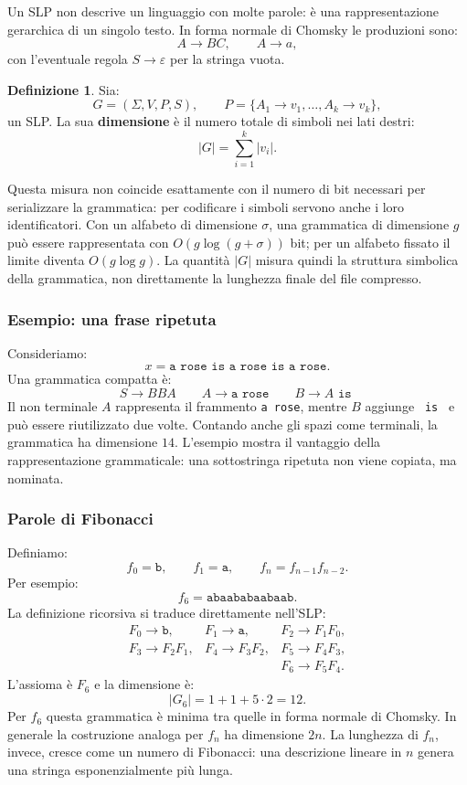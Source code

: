 \documentclass{article}
\theoremstyle{definition}
\newtheorem{definizione}{Definizione}[section]
\numberwithin{equation}{section}
\begin{document}
Un SLP non descrive un linguaggio con molte parole: è una rappresentazione
gerarchica di un singolo testo. In forma normale di Chomsky le produzioni sono:
\[
    A\to BC,
    \qquad
    A\to a,
\]
con l'eventuale regola $S\to\varepsilon$ per la stringa vuota.

\begin{definizione}
    Sia:
    \[
        G=(\Sigma,V,P,S),
        \qquad
        P=\{A_1\to v_1,\ldots,A_k\to v_k\},
    \]
    un SLP. La sua \textbf{dimensione} è il numero totale di simboli nei lati
    destri:
    \begin{equation}\label{eq:grammar_size}
        |G|=\sum_{i=1}^{k}|v_i|.
    \end{equation}
\end{definizione}

Questa misura non coincide esattamente con il numero di bit necessari per
serializzare la grammatica: per codificare i simboli servono anche i loro
identificatori. Con un alfabeto di dimensione $\sigma$, una grammatica di
dimensione $g$ può essere rappresentata con
$O(g\log(g+\sigma))$ bit; per un alfabeto fissato il limite diventa
$O(g\log g)$. La quantità $|G|$ misura quindi la struttura simbolica della
grammatica, non direttamente la lunghezza finale del file compresso.

\subsubsection{Esempio: una frase ripetuta}
Consideriamo:
\[
    x=\texttt{a rose is a rose is a rose}.
\]
Una grammatica compatta è:
\[
    S\to BBA
    \qquad
    A\to\texttt{a rose}
    \qquad
    B\to A\texttt{\ is\ }
\]
Il non terminale $A$ rappresenta il frammento \texttt{a rose}, mentre $B$
aggiunge \texttt{ is } e può essere riutilizzato due volte. Contando anche gli
spazi come terminali, la grammatica ha dimensione $14$. L'esempio mostra il
vantaggio della rappresentazione grammaticale: una sottostringa ripetuta non
viene copiata, ma nominata.

\subsubsection{Parole di Fibonacci}
Definiamo:
\[
    f_0=\texttt{b},
    \qquad
    f_1=\texttt{a},
    \qquad
    f_n=f_{n-1}f_{n-2}.
\]
Per esempio:
\[
    f_6=\texttt{abaababaabaab}.
\]
La definizione ricorsiva si traduce direttamente nell'SLP:
\[
    \begin{array}{lll}
        F_0\to\texttt{b}, &
        F_1\to\texttt{a}, &
        F_2\to F_1F_0,                         \\
        F_3\to F_2F_1,    &
        F_4\to F_3F_2,    &
        F_5\to F_4F_3,                         \\
                          &   & F_6\to F_5F_4.
    \end{array}
\]
L'assioma è $F_6$ e la dimensione è:
\[
    |G_6|=1+1+5\cdot 2=12.
\]
Per $f_6$ questa grammatica è minima tra quelle in forma normale di Chomsky.
In generale la costruzione analoga per $f_n$ ha dimensione $2n$. La lunghezza
di $f_n$, invece, cresce come un numero di Fibonacci: una descrizione lineare
in $n$ genera una stringa esponenzialmente più lunga.
\end{document}
